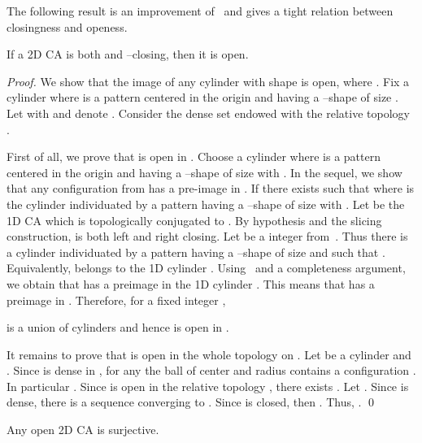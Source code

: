 \documentclass{llncs}
\begin{document}
The following result is an improvement of~\cite[Thm. 2]{dennunzio08}
and gives a tight relation between closingness and
openess.
\begin{theorem}\label{th:2closingopen}
  If a 2D CA  is both  and --closing,
  then it is open.
\end{theorem}
\begin{proof}
We show that the image of any cylinder with 
shape is open, where . Fix a cylinder  where 
is a pattern centered in the origin and having a
--shape of size . Let 
with  and denote . Consider the
dense set  endowed with the relative
topology . 
\smallskip

First of all, we prove that  is open in .
Choose a cylinder  where  is a pattern centered in
the origin and having a --shape of size
 with . In the sequel, we show that any
configuration from  has a pre-image in . If  there exists  such that  where  is the cylinder
individuated by a pattern  having a --shape
of size  with . Let  be the 1D CA which is topologically conjugated to
. By hypothesis and the slicing
construction,  is both left and right closing.
Let  be a integer from~\cite[Prop. 5.44]{kurka04}. Thus there
is a cylinder  individuated by a
pattern  having a --shape of size  and
such that . Equivalently,  belongs to the 1D
cylinder .
Using~\cite[Prop. 5.44]{kurka04} and a completeness argument, we
obtain that  has a preimage in the 1D cylinder
. This means that
 has a preimage in . Therefore, for a fixed integer ,
   
is a union of cylinders and hence  is open in 
.
\smallskip

It remains to prove that  is open in the whole topology on
. Let  be a cylinder and . Since  is
dense in , for any  the ball  of
center  and radius  contains a configuration . In particular .
Since  is open in the relative topology , there
exists . Let
. Since  is dense, there is a
sequence 
converging to . Since  is closed, then .
Thus, . \qed
\end{proof}
\begin{proposition}
   Any open 2D CA is surjective.
\end{proposition}
\end{document}
